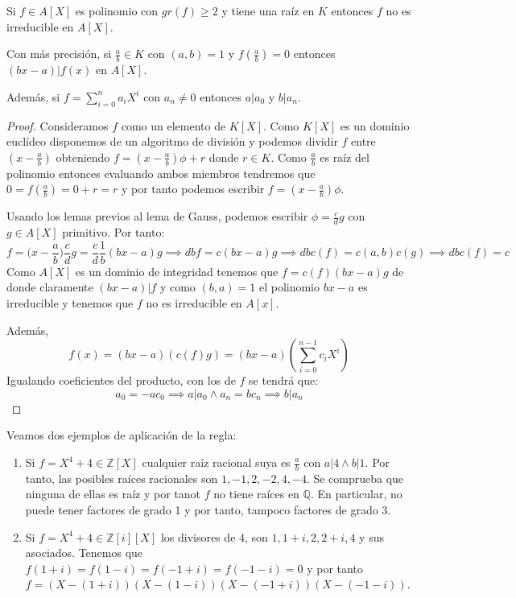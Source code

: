 \begin{proposition}
Si $f \in A[X]$ es polinomio con $gr(f) \ge 2$ y tiene una raíz en $K$ entonces $f$ no es irreducible en $A[X]$. 

Con más precisión, si $\frac{a}{b} \in K$ con $(a,b) = 1$ y $f(\frac{a}{b}) = 0$ entonces $(bx-a)|f(x)$ en $A[X]$. 

Además, si $f = \sum_{i = 0}^n a_iX^i$ con $a_n \neq 0$ entonces $a|a_0$ y $b|a_n$. 
\end{proposition}
\begin{proof}
Consideramos $f$ como un elemento de $K[X]$. Como $K[X]$ es un dominio euclídeo disponemos de un algoritmo de división y podemos dividir $f$ entre $(x - \frac{a}{b})$ obteniendo $f = (x - \frac{a}{b})\phi + r$ donde $r \in K$. Como $\frac{a}{b}$ es raíz del polinomio entonces evaluando ambos miembros tendremos que $0 = f(\frac{a}{b}) = 0 + r = r$ y por tanto podemos escribir $f = (x - \frac{a}{b})\phi$. 

Usando los lemas previos al lema de Gauss, podemos escribir $\phi = \frac{c}{d}g$ con $g \in A[X]$ primitivo. Por tanto: $$f = \Big(x - \frac{a}{b}\Big) \frac{c}{d}g = \frac{c}{d} \frac{1}{b} (bx - a)g \implies dbf = c(bx-a)g \implies dbc(f) = c(a,b)c(g) \implies dbc(f) = c$$ Como $A[X]$ es un dominio de integridad tenemos que $f = c(f)(bx-a)g$ de donde claramente $(bx-a)|f$ y como $(b,a) = 1$ el polinomio $bx-a$ es irreducible y tenemos que $f$ no es irreducible en $A[x]$. 

Además, $$f(x) = (bx-a)(c(f)g) = (bx-a)(\sum_{i = 0}^{n-1} c_iX^i)$$ Igualando coeficientes del producto, con los de $f$ se tendrá que: $$a_0 = -ac_0 \implies a|a_0 \land a_n = bc_n \implies b|a_n$$ 
\end{proof}

\begin{example}
Veamos dos ejemplos de aplicación de la regla:

\begin{enumerate}
\item Si $f = X^4 + 4 \in \mathbb{Z}[X]$ cualquier raíz racional suya es $\frac{a}{b}$ con $a|4 \land b |1$. Por tanto, las posibles raíces racionales son $1,-1,2,-2,4,-4$. Se comprueba que ninguna de ellas es raíz y por tanot $f$ no tiene raíces en $\mathbb{Q}$. En particular, no puede tener factores de grado 1 y por tanto, tampoco factores de grado 3. 
\item Si $f = X^4+4 \in \mathbb{Z}[i][X]$ los divisores de 4, son $1,1+i,2,2+i,4$ y sus asociados. Tenemos que $f(1+i) = f(1-i) = f(-1+i) = f(-1-i) = 0$ y por tanto $f = (X-(1+i))(X-(1-i))(X-(-1+i))(X-(-1-i))$. 
\end{enumerate}
\end{example}

